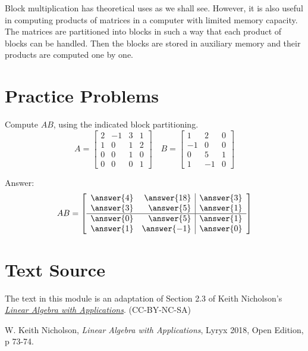 \documentclass{ximera}
\begin{document}
Block multiplication has theoretical uses as we shall see. However, it is also useful in computing products of matrices in a computer with limited memory capacity. The matrices are partitioned into blocks in such a way that each product of blocks can be handled. Then the blocks are stored in auxiliary memory and their products are computed one by one.

\section*{Practice Problems}

\begin{problem}\label{prob:blockmatmult1}
Compute $AB$, using the indicated block partitioning.
\begin{equation*}
A = \left[ \begin{array}{rr|rr}
2 & -1 & 3 & 1 \\
1 & 0  & 1 & 2 \\
\hline
0 & 0 & 1 & 0 \\
0 & 0 & 0 & 1
\end{array} \right] \quad
B = \left[ \begin{array}{rr|r}
1 & 2 & 0 \\
-1 & 0  & 0 \\
\hline
0 & 5 & 1 \\
1 & -1 & 0 
\end{array} \right]
\end{equation*}

Answer:
\begin{equation*}
AB = \left[ \begin{array}{rr|r}
\answer{4} & \answer{18} & \answer{3} \\
\answer{3} & \answer{5}  & \answer{1} \\
\hline
\answer{0} & \answer{5} & \answer{1} \\
\answer{1} & \answer{-1} & \answer{0}
\end{array} \right] 
\end{equation*}

\end{problem}

\section*{Text Source}
The text in this module is an adaptation of Section 2.3 of Keith Nicholson's \href{https://open.umn.edu/opentextbooks/textbooks/linear-algebra-with-applications}{\it Linear Algebra with Applications}. (CC-BY-NC-SA)

W. Keith Nicholson, {\it Linear Algebra with Applications}, Lyryx 2018, Open Edition, p 73-74.
\end{document}
